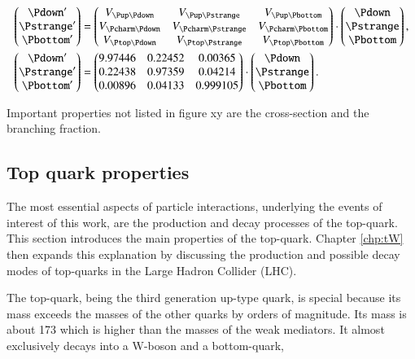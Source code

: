 \begin{align}
\begin{pmatrix}
\Pdown^{\prime} \\
\Pstrange^{\prime} \\
\Pbottom^{\prime}
\end{pmatrix}
&=
\begin{pmatrix}
\Vud & \Vus & \Vub \\
\Vcd & \Vcs & \Vcb \\
\Vtd & \Vts & \Vtb \\
\end{pmatrix}
\cdot
\begin{pmatrix}
\Pdown \\
\Pstrange \\
\Pbottom
\end{pmatrix},\\
%
\begin{pmatrix}
\Pdown^{\prime} \\
\Pstrange^{\prime} \\
\Pbottom^{\prime}
\end{pmatrix}
&=
\begin{pmatrix}
9.97446 & 0.22452 & 0.00365 \\
0.22438 & 0.97359 & 0.04214 \\
0.00896 & 0.04133 & 0.999105 \\
\end{pmatrix}
\cdot
\begin{pmatrix}
\Pdown \\
\Pstrange \\
\Pbottom
\end{pmatrix}.
\end{align}

Important properties not listed in figure xy are the cross-section and the branching fraction.

\subsection{Top quark properties}


The most essential aspects of particle interactions, underlying the events of interest of this work, are the production and decay processes of the top-quark. This section introduces the main properties of the top-quark. Chapter \ref{chp:tW} then expands this explanation by discussing the production and possible decay modes of top-quarks in the Large Hadron Collider (LHC).

The top-quark, being the third generation up-type quark, is special because its mass exceeds the masses of the other quarks by orders of magnitude. Its mass is about \SI{173}{\GeVovercsq} which is higher than the masses of the weak mediators. It almost exclusively decays into a W-boson and a bottom-quark,

